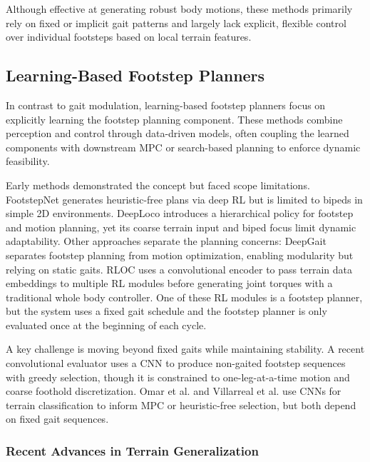 Although effective at generating robust body motions, these methods
primarily rely on fixed or implicit gait patterns and largely lack
explicit, flexible control over individual footsteps based on local
terrain features.

\subsection{Learning-Based Footstep Planners}
\label{sec:hybrid-footstep-planners}

In contrast to gait modulation, learning-based footstep planners
focus on explicitly learning the footstep planning component. These
methods combine perception and control through data-driven models,
often coupling the learned components with downstream MPC or
search-based planning to enforce dynamic feasibility.

Early methods demonstrated the concept but faced scope limitations.
FootstepNet \cite{gaspard_footstepnet_2024} generates heuristic-free
plans via deep RL but is limited to bipeds in simple 2D environments.
DeepLoco \cite{peng_deeploco_2017} introduces a hierarchical policy
for footstep and motion planning, yet its coarse terrain input and
biped focus limit dynamic adaptability. Other approaches separate the
planning concerns: DeepGait \cite{tsounis_deepgait_2020} separates
footstep planning from motion optimization, enabling modularity but
relying on static gaits. RLOC \cite{gangapurwala_rloc_2022} uses
a convolutional encoder to pass terrain data embeddings to multiple
RL modules before generating joint torques with a traditional whole
body controller. One of these RL modules is a footstep planner,
but the system uses a fixed gait schedule and the footstep planner
is only evaluated once at the beginning of each cycle.

A key challenge is moving beyond fixed gaits while maintaining
stability. A recent convolutional evaluator
\cite{bratta_contactnet_2024} uses a CNN to
produce non-gaited footstep sequences with greedy selection, though
it is constrained to one-leg-at-a-time motion and coarse foothold
discretization. Omar et al. \cite{omar_fast_2022} and Villarreal et
al. \cite{villarreal_fast_2019} use CNNs for terrain classification
to inform MPC or heuristic-free selection, but both depend on fixed
gait sequences.

\subsubsection{Recent Advances in Terrain Generalization}

